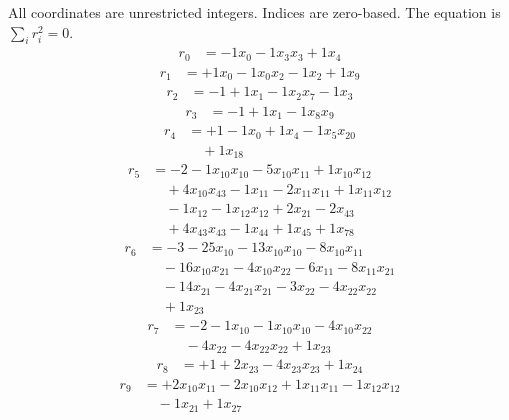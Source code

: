 \begingroup\small
All coordinates are unrestricted integers. Indices are zero-based. The equation is $\sum_i r_i^2=0$.
\[\begin{aligned}
r_{0} &= - 1 x_{0} - 1 x_{3} x_{3} + 1 x_{4}
\end{aligned}\]
\[\begin{aligned}
r_{1} &= + 1 x_{0} - 1 x_{0} x_{2} - 1 x_{2} + 1 x_{9}
\end{aligned}\]
\[\begin{aligned}
r_{2} &= - 1 + 1 x_{1} - 1 x_{2} x_{7} - 1 x_{3}
\end{aligned}\]
\[\begin{aligned}
r_{3} &= - 1 + 1 x_{1} - 1 x_{8} x_{9}
\end{aligned}\]
\[\begin{aligned}
r_{4} &= + 1 - 1 x_{0} + 1 x_{4} - 1 x_{5} x_{20} \\
 &\quad + 1 x_{18}
\end{aligned}\]
\[\begin{aligned}
r_{5} &= - 2 - 1 x_{10} x_{10} - 5 x_{10} x_{11} + 1 x_{10} x_{12} \\
 &\quad + 4 x_{10} x_{43} - 1 x_{11} - 2 x_{11} x_{11} + 1 x_{11} x_{12} \\
 &\quad - 1 x_{12} - 1 x_{12} x_{12} + 2 x_{21} - 2 x_{43} \\
 &\quad + 4 x_{43} x_{43} - 1 x_{44} + 1 x_{45} + 1 x_{78}
\end{aligned}\]
\[\begin{aligned}
r_{6} &= - 3 - 25 x_{10} - 13 x_{10} x_{10} - 8 x_{10} x_{11} \\
 &\quad - 16 x_{10} x_{21} - 4 x_{10} x_{22} - 6 x_{11} - 8 x_{11} x_{21} \\
 &\quad - 14 x_{21} - 4 x_{21} x_{21} - 3 x_{22} - 4 x_{22} x_{22} \\
 &\quad + 1 x_{23}
\end{aligned}\]
\[\begin{aligned}
r_{7} &= - 2 - 1 x_{10} - 1 x_{10} x_{10} - 4 x_{10} x_{22} \\
 &\quad - 4 x_{22} - 4 x_{22} x_{22} + 1 x_{23}
\end{aligned}\]
\[\begin{aligned}
r_{8} &= + 1 + 2 x_{23} - 4 x_{23} x_{23} + 1 x_{24}
\end{aligned}\]
\[\begin{aligned}
r_{9} &= + 2 x_{10} x_{11} - 2 x_{10} x_{12} + 1 x_{11} x_{11} - 1 x_{12} x_{12} \\
 &\quad - 1 x_{21} + 1 x_{27}
\end{aligned}\]
